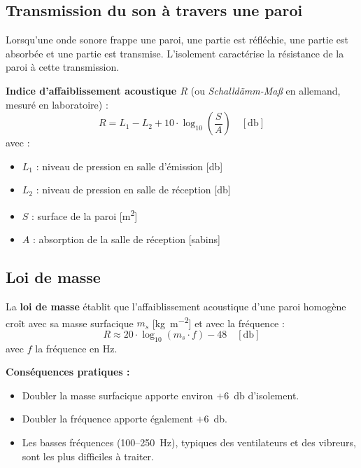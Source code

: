 \subsection{Transmission du son à travers une paroi}

Lorsqu'une onde sonore frappe une paroi, une partie est réfléchie, une partie est absorbée et une partie est transmise. L'isolement caractérise la résistance de la paroi à cette transmission.

\begin{definition}
\textbf{Indice d'affaiblissement acoustique $R$} (ou \textit{Schalldämm-Maß} en allemand, mesuré en laboratoire) :
\[
  R = L_1 - L_2 + 10 \cdot \log_{10}\!\left(\frac{S}{A}\right) \quad [\si{\decibel}]
\]
avec :
\begin{itemize}
  \item $L_1$ : niveau de pression en salle d'émission [\si{\decibel}]
  \item $L_2$ : niveau de pression en salle de réception [\si{\decibel}]
  \item $S$ : surface de la paroi [\si{\metre\squared}]
  \item $A$ : absorption de la salle de réception [sabins]
\end{itemize}
\end{definition}

\subsection{Loi de masse}

\begin{definition}
La \textbf{loi de masse} établit que l'affaiblissement acoustique d'une paroi homogène croît avec sa masse surfacique $m_s$ [\si{\kilogram\per\metre\squared}] et avec la fréquence :
\[
  R \approx 20 \cdot \log_{10}(m_s \cdot f) - 48 \quad [\si{\decibel}]
\]
avec $f$ la fréquence en \si{\hertz}.
\end{definition}

\textbf{Conséquences pratiques :}
\begin{itemize}
  \item Doubler la masse surfacique apporte environ $+6$~\si{\decibel} d'isolement.
  \item Doubler la fréquence apporte également $+6$~\si{\decibel}.
  \item Les basses fréquences (100--250~\si{\hertz}), typiques des ventilateurs et des vibreurs, sont les plus difficiles à traiter.
\end{itemize}


